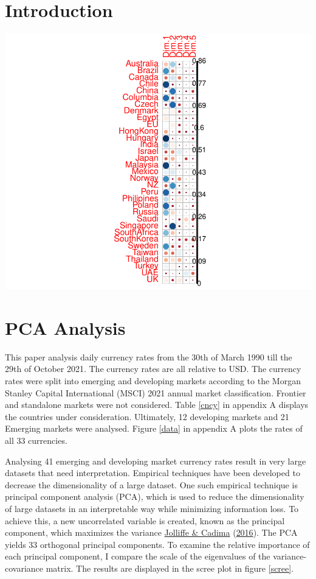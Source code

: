 \documentclass[11pt,preprint, authoryear]{elsarticle}
\numberwithin{equation}{section}
\numberwithin{figure}{section}
\numberwithin{table}{section}
\begin{document}
\hypertarget{introduction}{%
\section{\texorpdfstring{Introduction
\label{Introduction}}{Introduction }}\label{introduction}}

\includegraphics{Essay_files/figure-latex/unnamed-chunk-3-1.pdf}

\hypertarget{pca-analysis}{%
\section{PCA Analysis}\label{pca-analysis}}

This paper analysis daily currency rates from the 30th of March 1990
till the 29th of October 2021. The currency rates are all relative to
USD. The currency rates were split into emerging and developing markets
according to the Morgan Stanley Capital International (MSCI) 2021 annual
market classification. Frontier and standalone markets were not
considered. Table \ref{cncy} in appendix A displays the countries under
consideration. Ultimately, 12 developing markets and 21 Emerging markets
were analysed. Figure \ref{data} in appendix A plots the rates of all 33
currencies.

Analysing 41 emerging and developing market currency rates result in
very large datasets that need interpretation. Empirical techniques have
been developed to decrease the dimensionality of a large dataset. One
such empirical technique is principal component analysis (PCA), which is
used to reduce the dimensionality of large datasets in an interpretable
way while minimizing information loss. To achieve this, a new
uncorrelated variable is created, known as the principal component,
which maximizes the variance \protect\hyperlink{ref-jolli}{Jolliffe \&
Cadima} (\protect\hyperlink{ref-jolli}{2016}). The PCA yields 33
orthogonal principal components. To examine the relative importance of
each principal component, I compare the scale of the eigenvalues of the
variance-covariance matrix. The results are displayed in the scree plot
in figure \ref{scree}.
\end{document}
